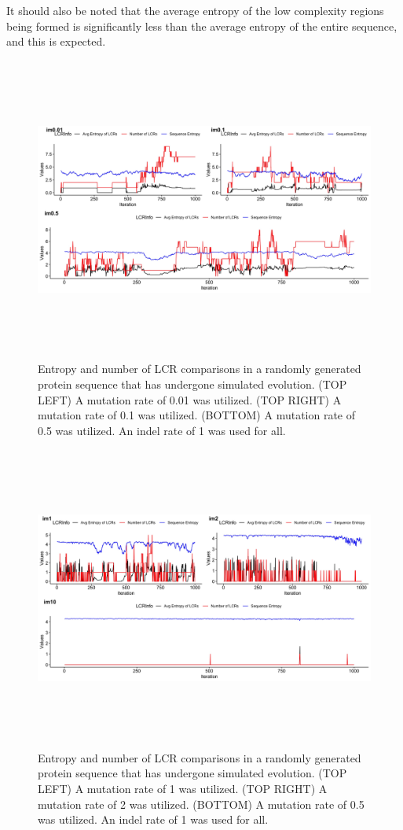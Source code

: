 \documentclass[10pt]{article}
\begin{document}
It should also be noted that the average entropy of the low complexity regions being formed is significantly less than the average entropy of the entire sequence, and this is expected. 

\begin{figure}[H]
	\includegraphics[width=18cm, height=10cm]{m0.01-0.1-0.5.jpeg}
	\caption{Entropy and number of LCR comparisons in a randomly generated protein sequence that has undergone simulated evolution. (TOP LEFT) A mutation rate of 0.01 was utilized. (TOP RIGHT) A mutation rate of 0.1 was utilized. (BOTTOM) A mutation rate of 0.5 was utilized. An indel rate of 1 was used for all.}
	\label{fig:3}
\end{figure}

\begin{figure}[H]
	\includegraphics[width=18cm, height=10cm]{m1-2-10.jpeg}
	\caption{Entropy and number of LCR comparisons in a randomly generated protein sequence that has undergone simulated evolution. (TOP LEFT) A mutation rate of 1 was utilized. (TOP RIGHT) A mutation rate of 2 was utilized. (BOTTOM) A mutation rate of 0.5 was utilized. An indel rate of 1 was used for all.}
	\label{fig:4}
\end{figure}
\end{document}

